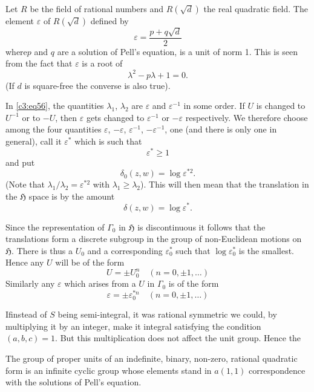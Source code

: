 Let $R$ be the field of rational numbers and $R(\sqrt{d})$ the real
quadratic field. The element $\varepsilon$ of $R(\sqrt{d})$ defined by
$$
\varepsilon=\frac{p+q\sqrt{d}}{2}
$$
where\pageoriginale $p$ and $q$ are a solution of Pell's equation, is
a unit of norm 1. This is seen from the fact that $\varepsilon$ is a root
of
$$
\lambda^{2}-p\lambda+1=0.
$$
(If $d$ is square-free the converse is also true).

In \eqref{c3:eq56}, the quantities $\lambda_{1}$, $\lambda_{2}$ are
$\varepsilon$ and $\varepsilon^{-1}$ in some order. If $U$ is changed to
$U^{-1}$ or to $-U$, then $\varepsilon$ gets changed to $\varepsilon^{-1}$
or $-\varepsilon$ respectively. We therefore choose among the four
quantities $\varepsilon$, $-\varepsilon$, $\varepsilon^{-1}$, $-\varepsilon^{-1}$,
one (and there is only one in general), call it $\varepsilon^{\ast}$
which is such that 
$$
\varepsilon^{\ast}\geq 1
$$
and put 
$$
\delta_{0}(z,w)=\log \varepsilon^{\ast 2}.
$$
(Note that $\lambda_{1}/\lambda_{2}=\varepsilon^{\ast 2}$ with
$\lambda_{1}\geq \lambda_{2}$). This will then mean that the
translation in the $\mathfrak{H}$ space is by the amount 
$$
\delta(z,w)=\log \varepsilon^{\ast}.
$$

Since the representation of $\Gamma_{0}$ in $\mathfrak{H}$ is
discontinuous it follows that the translations form a discrete
subgroup in the group of non-Euclidean motions on
$\mathfrak{H}$. There is thus a $U_{0}$ and a corresponding
$\varepsilon^{\ast}_{0}$ such that $\log \varepsilon^{\ast}_{0}$ is the
smallest. Hence any $U$ will be of the form 
$$
U=\pm U^{n}_{0}\quad (n=0,\pm 1,\ldots)
$$
Similarly any $\varepsilon$ which arises from a $U$ in $\Gamma_{0}$ is of
the form
$$
\varepsilon=\pm \varepsilon^{\ast n}_{0}\quad (n=0,\pm 1,\ldots)
$$

If\pageoriginale instead of $S$ being semi-integral, it was rational
symmetric we could, by multiplying it by an integer, make it integral
satisfying the condition $(a,b,c)=1$. But this multiplication does not
affect the unit group. Hence the

\begin{thm}\label{chap3:thm4}
The group of proper units of an indefinite, binary, non-zero, rational
quadratic form is an infinite cyclic group whose elements stand in
$a(1,1)$ correspondence with the solutions of Pell's equation.
\end{thm}

